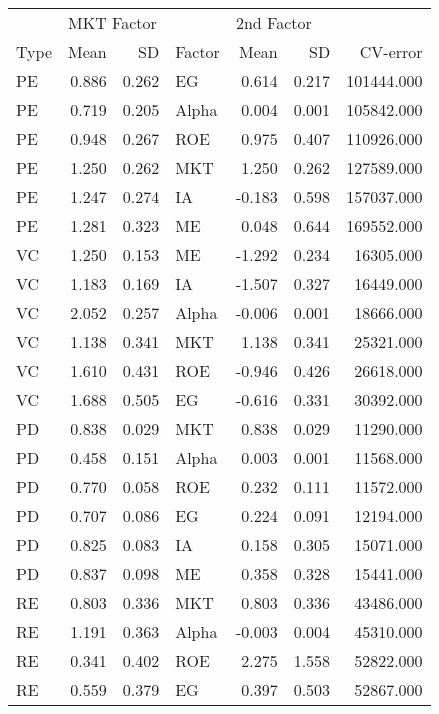 \documentclass[12pt]{article}
\begin{document}
\begin{table}[ht]
	\centering
	\begin{tabular}{lrrlrrr}
		 & \multicolumn{2}{l}{MKT Factor} & & \multicolumn{2}{l}{2nd Factor} & \\ 
		Type & Mean & SD & Factor & Mean & SD & CV-error \\ 
		\hline
		\hline
PE & 0.886 & 0.262 & EG & 0.614 & 0.217 & 101444.000 \\ 
PE & 0.719 & 0.205 & Alpha & 0.004 & 0.001 & 105842.000 \\ 
PE & 0.948 & 0.267 & ROE & 0.975 & 0.407 & 110926.000 \\ 
PE & 1.250 & 0.262 & MKT & 1.250 & 0.262 & 127589.000 \\ 
PE & 1.247 & 0.274 & IA & -0.183 & 0.598 & 157037.000 \\ 
PE & 1.281 & 0.323 & ME & 0.048 & 0.644 & 169552.000 \\ 
\hline
VC & 1.250 & 0.153 & ME & -1.292 & 0.234 & 16305.000 \\ 
VC & 1.183 & 0.169 & IA & -1.507 & 0.327 & 16449.000 \\ 
VC & 2.052 & 0.257 & Alpha & -0.006 & 0.001 & 18666.000 \\ 
VC & 1.138 & 0.341 & MKT & 1.138 & 0.341 & 25321.000 \\ 
VC & 1.610 & 0.431 & ROE & -0.946 & 0.426 & 26618.000 \\ 
VC & 1.688 & 0.505 & EG & -0.616 & 0.331 & 30392.000 \\ 
\hline
PD & 0.838 & 0.029 & MKT & 0.838 & 0.029 & 11290.000 \\ 
PD & 0.458 & 0.151 & Alpha & 0.003 & 0.001 & 11568.000 \\ 
PD & 0.770 & 0.058 & ROE & 0.232 & 0.111 & 11572.000 \\ 
PD & 0.707 & 0.086 & EG & 0.224 & 0.091 & 12194.000 \\ 
PD & 0.825 & 0.083 & IA & 0.158 & 0.305 & 15071.000 \\ 
PD & 0.837 & 0.098 & ME & 0.358 & 0.328 & 15441.000 \\ 
\hline
RE & 0.803 & 0.336 & MKT & 0.803 & 0.336 & 43486.000 \\ 
RE & 1.191 & 0.363 & Alpha & -0.003 & 0.004 & 45310.000 \\ 
RE & 0.341 & 0.402 & ROE & 2.275 & 1.558 & 52822.000 \\ 
RE & 0.559 & 0.379 & EG & 0.397 & 0.503 & 52867.000 \\ 

\end{tabular}
\end{table}
\end{document}
